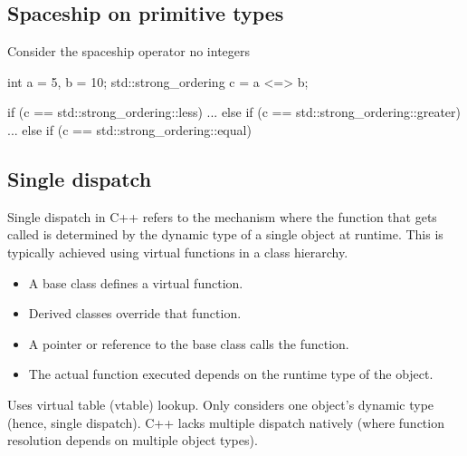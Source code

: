 \documentclass{report}
\begin{document}
\bigbreak \noindent 
\subsection{Spaceship on primitive types}
\bigbreak \noindent 
Consider the spaceship operator no integers
\bigbreak \noindent 
\begin{cppcode}
int a = 5, b = 10;
std::strong_ordering c = a <=> b;

if (c == std::strong_ordering::less) {
    ...
} else if (c == std::strong_ordering::greater) {
    ...
} else if (c == std::strong_ordering::equal)
\end{cppcode}

\pagebreak 
{}
\bigbreak \noindent 
\subsection{Single dispatch}
\bigbreak \noindent 
Single dispatch in C++ refers to the mechanism where the function that gets called is determined by the dynamic type of a single object at runtime. This is typically achieved using virtual functions in a class hierarchy.
\begin{itemize}
    \item A base class defines a virtual function.
    \item Derived classes override that function.
    \item A pointer or reference to the base class calls the function.
    \item The actual function executed depends on the runtime type of the object.
\end{itemize}
\bigbreak \noindent 
Uses virtual table (vtable) lookup. Only considers one object's dynamic type (hence, single dispatch). C++ lacks multiple dispatch natively (where function resolution depends on multiple object types).

\bigbreak \noindent 
\end{document}
